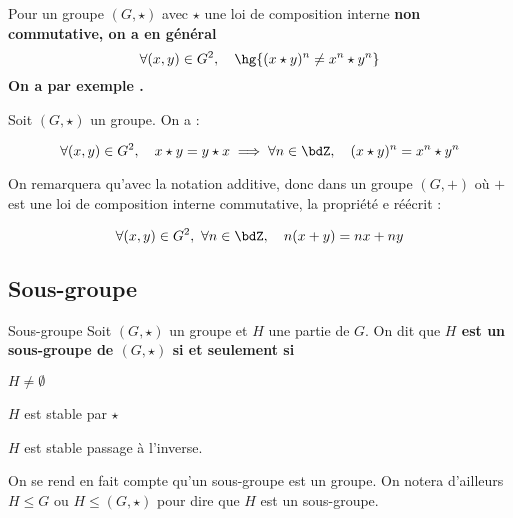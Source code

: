 \documentclass[a4paper,french,bookmarks]{article}
\begin{document}
\begin{warning}{}{}
    Pour un groupe $(G, \star)$ avec $\star$ une loi de composition interne \bf{non commutative}, on a en général 
    \[ \forall (x, y) \in G^2,\quad \hg{(x \star y)^n \neq x^n \star y^n}\]
    On a par exemple .
\end{warning}

\begin{property}{}{}
    Soit $(G, \star)$ un groupe. On a :
    
    \[ \forall (x, y) \in G^2, \quad x \star y = y \star x \implies \forall n \in \bdZ,\quad (x \star y)^n = x^n \star y^n\]
\end{property}


On remarquera qu'avec la notation additive, donc dans un groupe $(G, +)$ où $+$ est une loi de composition interne commutative, la propriété e réécrit :

\[ \forall (x, y) \in G^2,\ \forall n \in \bdZ, \quad n(x + y) = nx + ny\]

\subsection{Sous-groupe}

\begin{definition}{Sous-groupe}{}
    Soit $(G, \star)$ un groupe et $H$ une partie de $G$. On dit que \bf{$H$ est un sous-groupe de $(G, \star)$} si et seulement si
    \begin{enumerate}
        \ithand $H \neq \emptyset$
        
        \ithand $H$ est stable par $\star$
        
        \ithand $H$ est stable passage à l'inverse.
    \end{enumerate}
\end{definition}

On se rend en fait compte qu'un sous-groupe est un groupe. On notera d'ailleurs $H \leq G$ ou $H \leq (G, \star)$ pour dire que $H$ est un sous-groupe.
\end{document}

